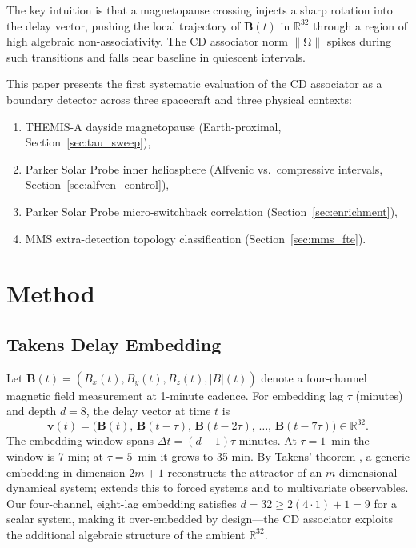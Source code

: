 \documentclass[draft]{agujournal2025}
\newcommand{\Assoc}{\mathrm{\Omega}}
\newcommand{\bvec}{\mathbf{B}}
\let\citep\cite%
\let\citet\citeA%
\begin{document}
The key intuition is that a magnetopause crossing injects a sharp rotation into
the delay vector, pushing the local trajectory of $\bvec(t)$ in $\mathbb{R}^{32}$
through a region of high algebraic non-associativity.  The CD associator norm
$\|\Assoc\|$ spikes during such transitions and falls near baseline in quiescent
intervals.

This paper presents the first systematic evaluation of the CD associator as a
boundary detector across three spacecraft and three physical contexts:
\begin{enumerate}
  \item THEMIS-A \citep{angelopoulos2008} dayside magnetopause (Earth-proximal,
    Section~\ref{sec:tau_sweep}),
  \item Parker Solar Probe \citep{fox2016} inner heliosphere (Alfvenic vs.\ compressive
    intervals, Section~\ref{sec:alfven_control}),
  \item Parker Solar Probe micro-switchback correlation (Section~\ref{sec:enrichment}),
  \item MMS \citep{burch2016} extra-detection topology classification
    (Section~\ref{sec:mms_fte}).
\end{enumerate}

\section{Method}
\label{sec:method}

\subsection{Takens Delay Embedding}

Let $\bvec(t) = (B_x(t), B_y(t), B_z(t), |B|(t))$ denote a four-channel
magnetic field measurement at 1-minute cadence.
For embedding lag $\tau$ (minutes) and depth $d = 8$, the delay vector at
time $t$ is
\begin{equation}
  \mathbf{v}(t) = \bigl(
    \bvec(t),\,
    \bvec(t-\tau),\,
    \bvec(t-2\tau),\,
    \ldots,\,
    \bvec(t-7\tau)
  \bigr) \in \mathbb{R}^{32}.
  \label{eq:delay_vector}
\end{equation}
The embedding window spans $\Delta t = (d-1)\tau$ minutes.  At $\tau=1$~min
the window is 7 min; at $\tau=5$~min it grows to 35 min.
By Takens' theorem \citep{takens1981}, a generic embedding in dimension
$2m+1$ reconstructs the attractor of an $m$-dimensional dynamical system;
\citet{stark1999} extends this to forced systems and \citet{deyle2011} to
multivariate observables.  Our four-channel, eight-lag embedding satisfies
$d=32 \geq 2(4\cdot 1)+1 = 9$ for a scalar system, making it
over-embedded by design---the CD associator exploits the additional
algebraic structure of the ambient $\mathbb{R}^{32}$.
\end{document}
